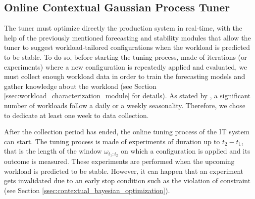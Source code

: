 \documentclass[a4paper, 12pt]{article} %
\begin{document}
	
	\subsection{Online Contextual Gaussian Process Tuner} \label{ssec:online_cgp_tuner}
	The tuner must optimize directly the production system in real-time, with the help of the previously mentioned forecasting and stability modules that allow the tuner to suggest workload-tailored configurations when the workload is predicted to be stable.
	To do so, before starting the tuning process, made of iterations (or experiments) where a new configuration is repeatedly applied and evaluated, we must collect enough workload data in order to train the forecasting models and gather knowledge about the workload (see Section \ref{ssec:workload_characterization_module} for details).
	As stated by \cite{Seagull}, a significant number of workloads follow a daily or a weekly seasonality. Therefore, we chose to dedicate at least one week to data collection.
	
	After the collection period has ended, the online tuning process of the IT system can start. The tuning process is made of experiments of duration up to $t_2 - t_1$, that is the length of the window $\omega_{t_1:t_2}$ on which a configuration is applied and its outcome is measured. These experiments are performed when the upcoming workload is predicted to be stable. However, it can happen that an experiment gets invalidated due to an early stop condition such as the violation of constraint (see Section \ref{ssec:contextual_bayesian_optimization}).  
	
\end{document}
